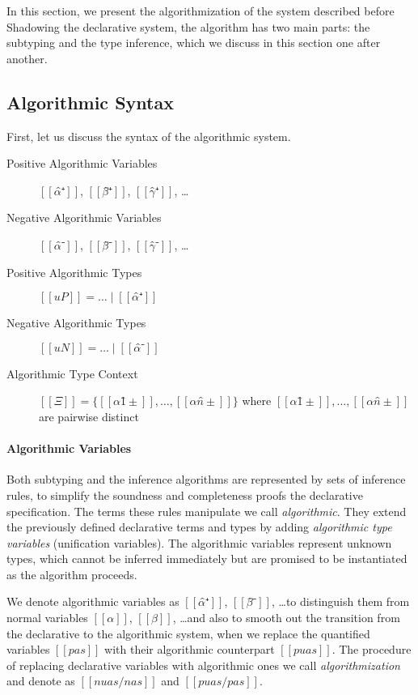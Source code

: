




In this section, we present the algorithmization of the system described before
Shadowing the declarative system, the algorithm has two main parts: 
the subtyping and the type inference, which we discuss in this section one after another. 

\subsection{Algorithmic Syntax}

First, let us discuss the syntax of the algorithmic system.

\begin{description}
        \item[Positive Algorithmic Variables] $[[α̂⁺]]$, $[[β̂⁺]]$, $[[γ̂⁺]]$, \dots 
        \item[Negative Algorithmic Variables] $[[α̂⁻]]$, $[[β̂⁻]]$, $[[γ̂⁻]]$, \dots
        \item[Positive Algorithmic Types] $[[uP]] = \dots \mid [[α̂⁺]]$  
        \item[Negative Algorithmic Types] $[[uN]] = \dots \mid [[α̂⁻]]$
        \item[Algorithmic Type Context] $[[Ξ]] = \{[[α1̂±]], \dots, [[αn̂±]]\}$
        where $[[α1̂±]], \dots, [[αn̂±]]$ are pairwise distinct 
\end{description}

\paragraph{Algorithmic Variables}
Both subtyping and the inference algorithms are represented by sets of inference rules, 
to simplify the soundness and completeness proofs \wrt the declarative specification. 
The terms these rules manipulate we call \emph{algorithmic}. They extend the 
previously defined declarative terms and types by adding \emph{algorithmic type variables}
(\aka unification variables). The algorithmic variables represent unknown types, 
which cannot be inferred immediately but are promised to be instantiated
as the algorithm proceeds.

We denote algorithmic variables as $[[α̂⁺]]$, $[[β̂⁻]]$, \dots to distinguish them from
normal variables $[[α]]$, $[[β]]$, \dots and also to smooth out the transition
from the declarative to the algorithmic system, when we replace the quantified variables $[[pas]]$ 
with their algorithmic counterpart $[[puas]]$.
The procedure of replacing declarative variables with algorithmic ones we call 
\emph{algorithmization} and denote as $[[ nuas/nas ]]$ and $[[ puas/pas ]]$.

